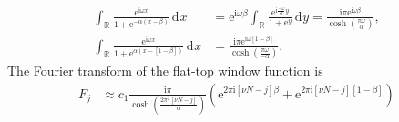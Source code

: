 \documentclass[english, parskip=full]{scrartcl}
\newcommand{\intr}{}
\newcommand{\kla}{}
\renewcommand{\i}{\text{i}}
\newcommand{\e}{\text{e}}
\begin{document}
\begin{align}
\intr\int_{\mathbb{R}^{ }} \frac{\e^{\i\omega x}}{1 + \e^{-\alpha(x-\beta)}} \, \mathrm{d}^{ }x &= \e^{\i\omega\beta}\intr\int_{\mathbb{R}^{ }} \frac{\e^{\i\frac{-\omega}{\alpha} y}}{1 + \e^{y}} \, \mathrm{d}^{ }y =  \frac{\i\pi\e^{\i\omega\beta}}{\cosh\kla\left( \frac{\pi\omega}{\alpha} \right)}, \\
\intr\int_{\mathbb{R}^{ }} \frac{\e^{\i\omega x}}{1 + \e^{\alpha (x-[1-\beta])}} \, \mathrm{d}^{ }x &= \frac{\i\pi\e^{\i\omega[1-\beta]}}{\cosh\kla\left( \frac{\pi\omega}{-\alpha} \right)}.
\end{align}
The Fourier transform of the flat-top window function is
\begin{align}
F_j &\approx c_1\frac{\i\pi}{\cosh\kla\left( \frac{2\pi^2[\nu N-j]}{\alpha} \right)}\kla\left( \e^{2\pi\i [\nu N-j]\beta} + \e^{2\pi\i [\nu N-j][1 - \beta]} \right)
\end{align}

\end{document}
